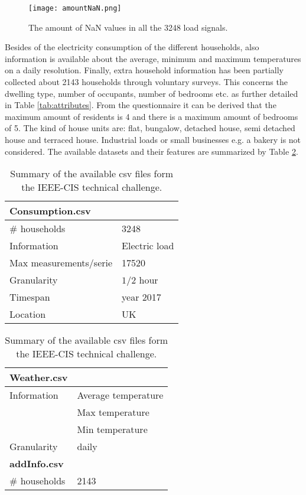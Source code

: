  \begin{figure}[h!]
 	\centering
 	\texttt{[image: amountNaN.png]}
 	\caption{The amount of NaN values in all the 3248 load signals.}
 	\label{fig:amountNaN}
 \end{figure}

Besides of the electricity consumption of the different households, also information is available about the average, minimum and maximum temperatures on a daily resolution. Finally, extra household information has been partially collected about 2143 households through voluntary surveys. This concerns the dwelling type, number of occupants, number of bedrooms etc. as further detailed in Table \ref{tab:attributes}. From the questionnaire it can be derived that the maximum amount of residents is 4 and there is a maximum amount of bedrooms of 5. The kind of house units are: flat, bungalow, detached house, semi detached house and terraced house. Industrial loads or small businesses e.g. a bakery is not considered. The available datasets and their features are summarized by Table \ref{tab:available_data}.\\

\begin{table}[h]%
	\raggedright
	\begin{tabular}[t]{@{}ll}
		\firsthline
		\textbf{Consumption.csv}&\\ \hline
		\# households &3248 \\ 
		Information & Electric load\\
		Max measurements/serie & 17520\\
		Granularity&$ 1/2$ hour\\ 
		Timespan&year 2017 \\    
		Location&UK\\ \bottomrule   
	\end{tabular}
	\hfill
	\raggedleft
	\begin{tabular}[t]{@{}ll}
		\firsthline
		\textbf{Weather.csv}&\\ \hline
		Information & Average temperature\\
		& Max temperature\\
		& Min temperature\\
		Granularity& daily\\ \hline
		\textbf{addInfo.csv}&\\ \hline
		\# households &2143 \\ \bottomrule		    
	\end{tabular}\\
	\caption{Summary of the available csv files form the IEEE-CIS technical challenge.}
	\label{tab:available_data}
\end{table}




